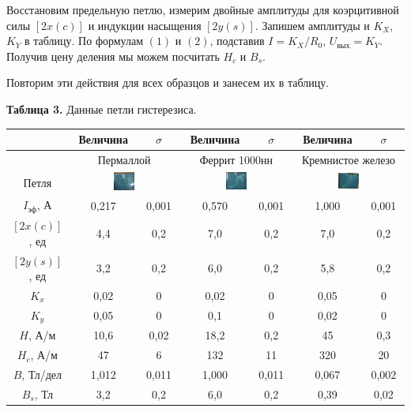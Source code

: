 \documentclass[a4paper, 12pt]{article}%
\begin{document}
Восстановим предельную петлю, измерим двойные амплитуды для коэрцитивной силы $[2x(c)]$ и индукции насыщения $[2y(s)]$. Запишем амплитуды и $K_X$, $K_Y$ в таблицу. По формулам $(1)$ и $(2)$, подставив $I = K_X/R_0$, $U_{\text{вых}} = K_Y$. Получив цену деления мы можем посчитать $H_c$ и $B_s$.

Повторим эти действия для всех образцов и занесем их в таблицу.
\begin{center}
\textbf{Таблица 3.} Данные петли гистерезиса.
\begin{tabular}{|c|c|c|c|c|c|c|}
\hline
 & Величина & $\sigma$ & Величина & $\sigma$ & Величина & $\sigma$ \\ \hline
 & \multicolumn{2}{c|}{Пермаллой} & \multicolumn{2}{c|}{Феррит 1000нн} & \multicolumn{2}{c|}{Кремнистое железо} \\ \hline
Петля & \multicolumn{2}{c|}{\includegraphics[width = 0.2\textwidth]{2.jpg}} &  \multicolumn{2}{c|}{\includegraphics[width = 0.2\textwidth]{3.jpg}} &  \multicolumn{2}{c|}{\includegraphics[width = 0.2\textwidth]{4.jpg}} \\ \hline
$I_{\text{эф}}$, А & 0,217 & 0,001 & 0,570 & 0,001 & 1,000 & 0,001 \\ \hline
$[2x(c)]$, ед & 4,4 & 0,2 & 7,0 & 0,2 & 7,0 & 0,2 \\ \hline
$[2y(s)]$, ед & 3,2 & 0,2 & 6,0 & 0,2 & 5,8 & 0,2 \\ \hline
$K_x$ & 0,02 & 0 & 0,02 & 0 & 0,05 & 0 \\ \hline
$K_y$ & 0,05 & 0 & 0,1 & 0 & 0,02 & 0 \\ \hline
$H$, А/м & 10,6 & 0,02 & 18,2 & 0,2 & 45 & 0,3 \\ \hline
$H_c$, А/м & 47 & 6 & 132 & 11 & 320 & 20 \\ \hline
$B$, Тл/дел & 1,012 & 0,011 & 1,000 & 0,011 & 0,067 & 0,002 \\ \hline
$B_s$, Тл & 3,2 & 0,2 & 6,0 & 0,2 & 0,39 & 0,02 \\ \hline
\end{tabular}\\
\end{center}
\end{document}
